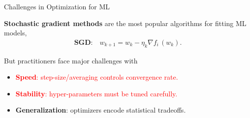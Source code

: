 \documentclass[mathserif,notheorems, hyperref={colorlinks, citecolor=blue, urlcolor=blue, linkcolor=blue}]{beamer}
\def\\{}%
\begin{document}
\begin{frame}{Challenges in Optimization for ML}

	\textbf{Stochastic gradient methods} are the most popular algorithms for fitting ML models,
	\begin{align*}
		\textbf{SGD:} \quad w_{k + 1} = w_k - \eta_k \nabla f_i \, (w_k). \\
	\end{align*}


	But practitioners face major challenges with \vspace{0.5em}
	\begin{itemize}
		\item \textcolor{red}{\textbf{Speed}: step-size/averaging controls convergence rate.}
		\item \textcolor{red}{\textbf{Stability}: hyper-parameters must be tuned carefully.}
		\item \textbf{Generalization}: optimizers encode statistical tradeoffs.
	\end{itemize}
	\vspace{1em}

\end{frame}
\end{document}
